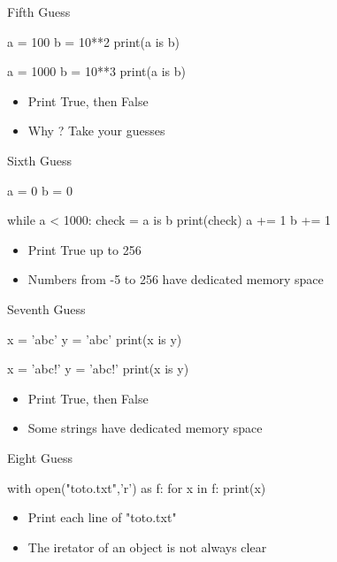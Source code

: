 \documentclass[serif, aspectratio=169]{beamer}
\begin{document}
\begin{frame}[fragile]{Fifth Guess}
    \begin{pythoncode}
    a = 100
    b = 10**2
    print(a is b)

    a = 1000
    b = 10**3
    print(a is b)
    \end{pythoncode}
    \vfill
    \pause
    \begin{itemize}
        \item Print True, then False
        \item Why ? Take your guesses
    \end{itemize}
\end{frame}

\begin{frame}[fragile]{Sixth Guess}
    \begin{pythoncode}
    a = 0
    b = 0

    while a < 1000:
        check = a is b
        print(check)
        a += 1
        b += 1
    \end{pythoncode}
    \vfill
    \pause
    \begin{itemize}
        \item Print True up to 256
        \item Numbers from -5 to 256 have dedicated memory space
    \end{itemize}
\end{frame}

\begin{frame}[fragile]{Seventh Guess}
    \begin{pythoncode}
    x = 'abc'
    y = 'abc'
    print(x is y)

    x = 'abc!'
    y = 'abc!'
    print(x is y)
    \end{pythoncode}
    \vfill
    \pause
    \begin{itemize}
        \item Print True, then False
        \item Some strings have dedicated memory space
    \end{itemize}
\end{frame}

\begin{frame}[fragile]{Eight Guess}
    \begin{pythoncode}
    with open("toto.txt",'r') as f:
        for x in f:
            print(x)
    \end{pythoncode}
    \vfill
    \pause
    \begin{itemize}
        \item Print each line of "toto.txt"
        \item The iretator of an object is not always clear
    \end{itemize}
\end{frame}
\end{document}
